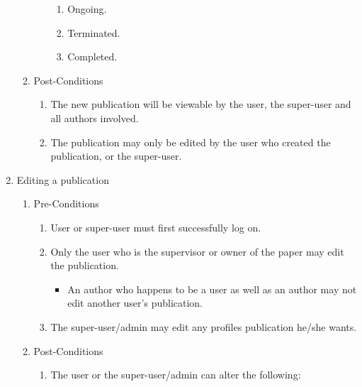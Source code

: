 \documentclass[hidelinks,a4paper,12pt]{article}
\begin{document}
\begin{enumerate}
\begin{enumerate}
\begin{enumerate}
				\begin{enumerate}
					\item  Ongoing.
					
					\item  Terminated.
					
					\item  Completed.
				\end{enumerate}
			\end{enumerate}
			
			\item  Post-Conditions
			
			\begin{enumerate}
				\item  The new publication will be viewable by the user, the super-user and all authors involved.
				
				\item  The publication may only be edited by the user who created the publication, or the super-user.
			\end{enumerate}
		\end{enumerate}
		
		\noindent  
		
		\item  Editing a publication
		
		\begin{enumerate}
			\item  Pre-Conditions
			
			\begin{enumerate}
				\item  User or super-user must first successfully log on.
				
				\item  Only the user who is the supervisor or owner of the paper may edit the publication.
				\begin{itemize}
					\item An author who happens to be a user as well as an author may not edit another user’s publication.
				\end{itemize}
				
				\item  The super-user/admin may edit any profiles publication he/she wants.
			\end{enumerate}
			
			\item  Post-Conditions
			
			\begin{enumerate}
				\item  The user or the super-user/admin can alter the following:
				

\end{enumerate}
\end{enumerate}
\end{enumerate}
\end{document}
